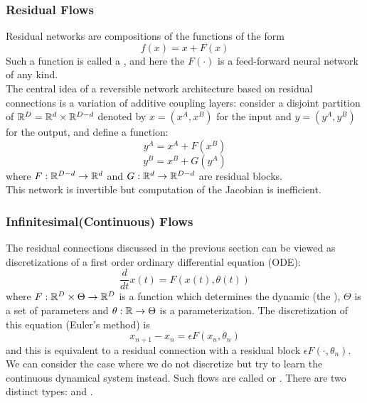 \documentclass[11pt]{article}
\begin{document}
\subsubsection{Residual Flows}
Residual networks are compositions of the functions of the form
$$f(x) = x + F(x)$$
Such a function is called a , and here the  $F(\cdot)$ is a feed-forward neural network of any kind.\\
The central idea of a reversible network architecture based on residual connections is a variation of additive coupling layers: consider a disjoint partition of $\mathbb{R}^D = \mathbb{R}^d \times \mathbb{R}^{D-d}$ denoted by $x = (x^A, x^B)$ for the input and $y = (y^A, y^B)$ for the output, and define a function:
$$y^A = x^A + F(x^B)$$
$$y^B = x^B + G(y^A)$$
where $F: \mathbb{R}^{D-d} \rightarrow \mathbb{R}^d$ and $G: \mathbb{R}^d \rightarrow \mathbb{R}^{D-d}$ are residual blocks.\\
This network is invertible but computation of the Jacobian is inefficient.
\subsubsection{Infinitesimal(Continuous) Flows}
The residual connections discussed in the previous section can be viewed as discretizations of a first order ordinary differential equation (ODE):
$$\frac{d}{dt} x(t) = F(x(t), \theta(t))$$
where $F: \mathbb{R}^D \times \Theta \rightarrow \mathbb{R}^D$ is a function which determines the dynamic (the ), $\Theta$ is a set of parameters and $\theta: \mathbb{R} \rightarrow \Theta$ is a parameterization. The discretization of this equation (Euler's method) is
$$x_{n+1} - x_n = \epsilon F(x_n,\theta_n)$$
and this is equivalent to a residual connection with a residual block $\epsilon F(\cdot, \theta_n)$. \\
We can consider the case where we do not discretize but try to learn the continuous dynamical system instead. Such flows are called  or . There are two distinct types:  and .
\end{document}
